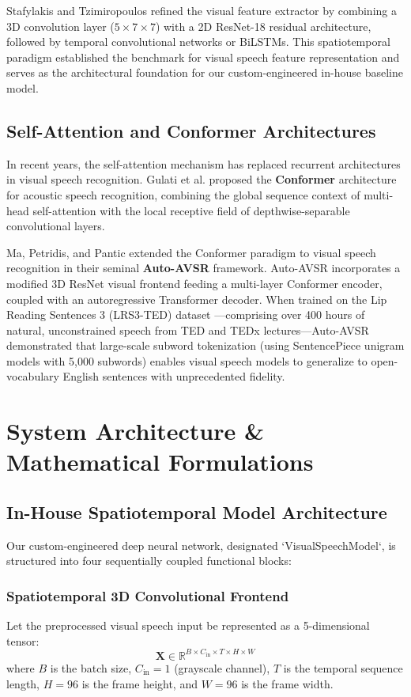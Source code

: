 \documentclass[conference,compsoc,10pt]{IEEEtran}
\begin{document}
Stafylakis and Tzimiropoulos \cite{stafylakis} refined the visual feature extractor by combining a 3D convolution layer ($5 \times 7 \times 7$) with a 2D ResNet-18 residual architecture, followed by temporal convolutional networks or BiLSTMs. This spatiotemporal paradigm established the benchmark for visual speech feature representation and serves as the architectural foundation for our custom-engineered in-house baseline model.

\subsection{Self-Attention and Conformer Architectures}
In recent years, the self-attention mechanism \cite{vaswani} has replaced recurrent architectures in visual speech recognition. Gulati et al. \cite{conformer} proposed the \textbf{Conformer} architecture for acoustic speech recognition, combining the global sequence context of multi-head self-attention with the local receptive field of depthwise-separable convolutional layers.

Ma, Petridis, and Pantic \cite{autoavsr1, autoavsr2} extended the Conformer paradigm to visual speech recognition in their seminal \textbf{Auto-AVSR} framework. Auto-AVSR incorporates a modified 3D ResNet visual frontend feeding a multi-layer Conformer encoder, coupled with an autoregressive Transformer decoder. When trained on the Lip Reading Sentences 3 (LRS3-TED) dataset \cite{lrs3}---comprising over 400 hours of natural, unconstrained speech from TED and TEDx lectures---Auto-AVSR demonstrated that large-scale subword tokenization (using SentencePiece unigram models with 5,000 subwords) enables visual speech models to generalize to open-vocabulary English sentences with unprecedented fidelity.

\section{System Architecture \& Mathematical Formulations}

\subsection{In-House Spatiotemporal Model Architecture}
Our custom-engineered deep neural network, designated `VisualSpeechModel`, is structured into four sequentially coupled functional blocks:

\subsubsection{Spatiotemporal 3D Convolutional Frontend}
Let the preprocessed visual speech input be represented as a 5-dimensional tensor:
\begin{equation}
\mathbf{X} \in \mathbb{R}^{B \times C_{\text{in}} \times T \times H \times W}
\end{equation}
where $B$ is the batch size, $C_{\text{in}} = 1$ (grayscale channel), $T$ is the temporal sequence length, $H = 96$ is the frame height, and $W = 96$ is the frame width.
\end{document}
